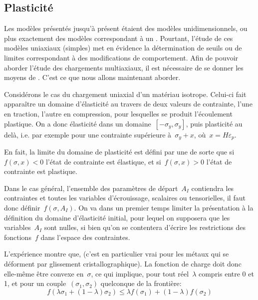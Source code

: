 \medskip
\subsection{Plasticité}

Les modèles présentés jusqu'à présent étaient des modèles unidimensionnels, ou plus exactement
des modèles correspondant à un .
Pourtant, l'étude de ces modèles uniaxiaux (simples) met en évidence la détermination de
seuils ou de limites correspondant à des modifications de comportement.
Afin de pouvoir aborder l'étude des chargements multiaxiaux, il est nécessaire de se donner les
moyens de .
C'est ce que nous allons maintenant aborder.

\medskip
Considérons le cas du chargement uniaxial d'un matériau isotrope.
Celui-ci fait apparaître un domaine d'élasticité au travers de deux valeurs de contrainte, l'une en traction,
l'autre en compression, pour lesquelles se produit l'écoulement plastique.
On a donc élasticité dans un domaine~$[-\sigma_y,\sigma_y]$, puis plasticité au delà, i.e. par exemple
pour une contrainte supérieure à~$\sigma_y+x$, où~$x=H\varepsilon_p$.

En fait, la limite du domaine de plasticité est défini par une 
de sorte que si~$f(\sigma,x)<0$ l'état de contrainte est élastique, et si~$f(\sigma,x)>0$
l'état de contrainte est plastique.

\medskip
Dans le cas général, l'ensemble des paramètres de départ~$A_I$ contiendra les contraintes et toutes
les variables d'écrouissage, scalaires ou tensorielles, il faut donc définir~$f(\sigma, A_I)$.
On va dans un premier temps limiter la présentation à la définition du domaine d'élasticité initial,
pour lequel on supposera que les variables~$A_I$ sont nulles, si bien qu'on se contentera d'écrire les
restrictions des fonctions~$f$ dans l'espace des contraintes.

L'expérience montre que,  (c'est en particulier vrai pour les métaux qui se déforment par glissement cristallographique).
La fonction de charge doit donc elle-même être convexe en~$\sigma$, ce qui implique, pour tout
réel~$\lambda$ compris entre 0 et 1, et pour un couple~$(\sigma_1, \sigma_2)$ quelconque de la frontière:
\begin{equation} f (\lambda\sigma_1 + (1-\lambda)\sigma_2) \le \lambda f(\sigma_1) + (1-\lambda) f(\sigma_2) \end{equation}

